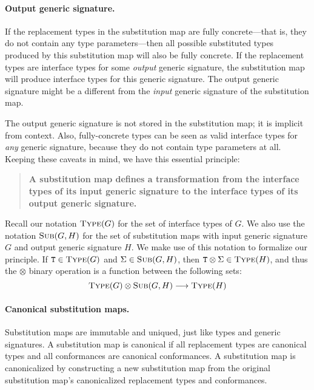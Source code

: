 \documentclass[../generics]{subfiles}
\begin{document}
\paragraph{Output generic signature.}
If the replacement types in the substitution map are fully concrete---that is, they do not contain any type parameters---then all possible substituted types produced by this substitution map will also be fully concrete. If the replacement types are interface types for some \emph{output} generic signature, the substitution map will produce interface types for this generic signature. The output generic signature might be a different from the \emph{input} generic signature of the substitution map. 

The output generic signature is not stored in the substitution map; it is implicit from context. Also, fully-concrete types can be seen as valid interface types for \emph{any} generic signature, because they do not contain type parameters at all. Keeping these caveats in mind, we have this essential principle:
\begin{quote}
\textbf{A substitution map defines a transformation from the interface types of its input generic signature to the interface types of its output generic signature.}
\end{quote}
Recall our notation $\textsc{Type}({G})$ for the set of interface types of $G$. We also use the notation $\textsc{Sub}({G, H})$ for the set of substitution maps with input generic signature $G$ and output generic signature $H$. We make use of this notation to formalize our principle. If $\texttt{T}\in\textsc{Type}({G})$ and $\Sigma\in\textsc{Sub}({G, H})$, then $\texttt{T}\otimes\Sigma\in\textsc{Type}({H})$, and thus the $\otimes$ binary operation is a function between the following sets:
\[\textsc{Type}({G})\otimes\textsc{Sub}({G, H})\longrightarrow\textsc{Type}({H})\]

\paragraph{Canonical substitution maps.}
%
%
%
%
Substitution maps are immutable and uniqued, just like types and generic signatures. A substitution map is canonical if all replacement types are canonical types and all conformances are canonical conformances. A substitution map is canonicalized by constructing a new substitution map from the original substitution map's canonicalized replacement types and conformances.
\end{document}
